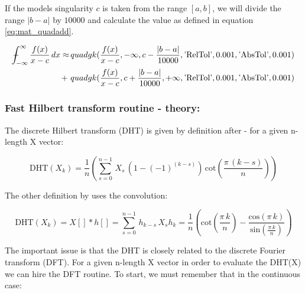 \documentclass[12pt,twoside,a4paper]{article}
\numberwithin{equation}{subsection}
\numberwithin{figure}{subsection}
\def\Xint#1{\mathchoice
{\XXint\displaystyle\textstyle{#1}}%
{\XXint\textstyle\scriptstyle{#1}}%
{\XXint\scriptstyle\scriptscriptstyle{#1}}%
{\XXint\scriptscriptstyle\scriptscriptstyle{#1}}%
\!\int}
\def\XXint#1#2#3{{\setbox0=\hbox{$#1{#2#3}{\int}$ }\vcenter{\hbox{$#2#3$ }}\kern-.6\wd0}}
\def\dashint{\Xint-}
\begin{document}
If the models singularity $c$ is taken from the range $[a, b]$, we will divide the range $|b-a|$ by $10000$ and calculate the value
as defined in equation \ref{eq:mat_quadadd}. 
 
\begin{alignat}{1} \label{eq:mat_quadadd}
  \dashint_{ - \infty }^{\infty } \frac {f(x)}{x-c} \, dx \approx 
          & \, quadgk(\frac {f(x)}{x-c}, - \infty, c - \frac{|b-a|}{10000}, \text{'RelTol'}, 0.001, \text{'AbsTol'}, 0.001 ) \\
     + \, & \, quadgk(\frac {f(x)}{x-c}, c + \frac{|b-a|}{10000}, + \infty, \text{'RelTol'}, 0.001, \text{'AbsTol'}, 0.001 )
     \nonumber
\end{alignat}
 
\subsubsection*{Fast Hilbert transform routine - theory:}

The discrete Hilbert transform (DHT) is given by definition after \cite{kak_multilayeredarray} - for a given n-length X vector:

\begin{equation} \label{eq:matlab_fhttheroy}
  \mathrm{DHT}({X_{k}})=\frac {1}{n} \left(  \! \sum_{s=0}^{n - 1}\,{X _{s}}\,(1 - ( - 1)^{(k - s)})\,\mathrm{cot}(\frac {\pi \,(k
  - s) }{n}) \!  \right) 
\end{equation}

The other definition by \cite{calvetti_computation} uses the convolution:

\begin{subequations} \label{eq:matlab_convolution}
  \begin{equation}   \label{eq:mconv_dht}
    \mathrm{DHT}({X_{k}})  = X[] * h[] = \sum_{s=0}^{n - 1}\,{h_{k - s}}\,{X_{s}}
  \end{equation}
  \begin{equation}   \label{eq:mconv_hk}
    {h_{k}}=\frac {1}{n} \left(  \! \mathrm{cot}(\frac {\pi \,k}{n}) - \frac {\mathrm{cos}(\pi \,k)}{\mathrm{sin}(\frac {\pi
    \,k}{n})}\! \right) 
  \end{equation}
\end{subequations}

The important issue is that the DHT is closely related to the discrete Fourier transform (DFT). For a given n-length X vector in
order to evaluate the DHT(X) we can hire the DFT routine. To start, we must remember that in the continuous case:
\end{document}
